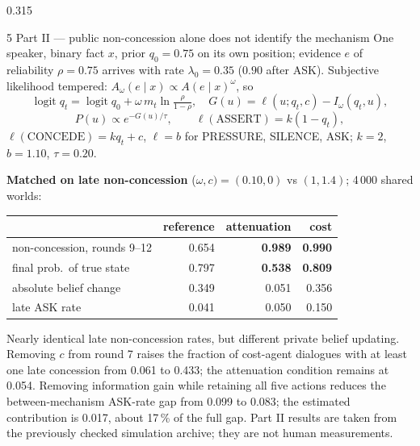 \documentclass[final,t]{beamer}
\newcommand{\Iw}{I_{\omega}}
\newcommand{\src}[1]{{\footnotesize\color{meta}#1}}
\begin{document}
\begin{frame}[t]
\begin{columns}[t,totalwidth=0.965\paperwidth]
\begin{column}{0.315\textwidth}
\begin{block}{5 \; Part II --- public non-concession alone does not identify the mechanism}
One speaker, binary fact $x$, prior $q_0=0.75$ on its own position; evidence $e$ of reliability $\rho=0.75$ arrives with rate $\lambda_0=0.35$ ($0.90$ after ASK). Subjective likelihood tempered: $A_{\omega}(e\mid x)\propto A(e\mid x)^{\omega}$, so
\[
\operatorname{logit} q_t=\operatorname{logit} q_0+\omega\, m_t \ln\tfrac{\rho}{1-\rho},\quad G(u)=\ell(u;q_t,c)-\Iw(q_t,u),
\]
\[
P(u)\propto e^{-G(u)/\tau},\qquad \ell(\text{ASSERT})=k(1-q_t),
\]
$\ell(\text{CONCEDE})=k q_t+c$, $\ell=b$ for PRESSURE, SILENCE, ASK; $k=2$, $b=1.10$, $\tau=0.20$.

\medskip
\textbf{Matched on late non-concession} ($\omega,c)=(0.10,0)$ vs $(1,1.4)$; 4\,000 shared worlds:

\smallskip
{\small\begin{tabular}{@{}lrrr@{}}
\toprule
 & reference & attenuation & cost\\
\midrule
non-concession, rounds 9--12 & 0.654 & \textbf{0.989} & \textbf{0.990}\\
final prob.\ of true state & 0.797 & \textbf{0.538} & \textbf{0.809}\\
absolute belief change & 0.349 & 0.051 & 0.356\\
late ASK rate & 0.041 & 0.050 & 0.150\\
\bottomrule
\end{tabular}}

\medskip
Nearly identical late non-concession rates, but different private belief updating. Removing $c$ from round 7 raises the fraction of cost-agent dialogues with at least one late concession from 0.061 to 0.433; the attenuation condition remains at 0.054. Removing information gain while retaining all five actions reduces the between-mechanism ASK-rate gap from 0.099 to 0.083; the estimated contribution is 0.017, about 17\,\% of the full gap. \src{Part II results are taken from the previously checked simulation archive; they are not human measurements.}
\end{block}


\end{column}
\end{columns}
\end{frame}
\end{document}
